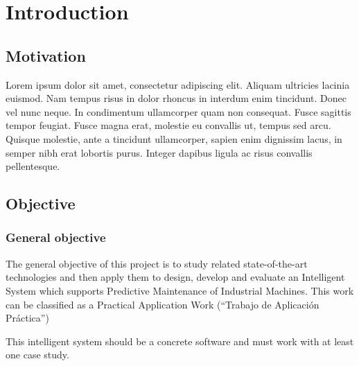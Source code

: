 
\chapter{Introduction} %

\label{Chapter1} %


\newcommand{\keyword}[1]{\textbf{#1}}
\newcommand{\tabhead}[1]{\textbf{#1}}
\newcommand{\code}[1]{\texttt{#1}}
\newcommand{\file}[1]{\texttt{\bfseries#1}}
\newcommand{\option}[1]{\texttt{\itshape#1}}


\section{Motivation}

Lorem ipsum dolor sit amet, consectetur adipiscing elit. Aliquam ultricies lacinia euismod. Nam tempus risus in dolor rhoncus in interdum enim tincidunt. Donec vel nunc neque. In condimentum ullamcorper quam non consequat. Fusce sagittis tempor feugiat. Fusce magna erat, molestie eu convallis ut, tempus sed arcu. Quisque molestie, ante a tincidunt ullamcorper, sapien enim dignissim lacus, in semper nibh erat lobortis purus. Integer dapibus ligula ac risus convallis pellentesque.

\section{Objective}

\subsection{General objective}

The general objective of this project is to study related state-of-the-art technologies and then apply them to design, develop and evaluate an Intelligent System which supports Predictive Maintenance of Industrial Machines. This work can be classified as a Practical Application Work (“Trabajo de Aplicación Práctica”)

This intelligent system should be a concrete software and must work with at least one case study.

